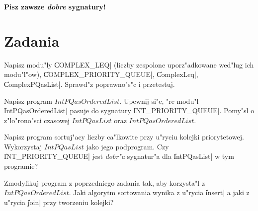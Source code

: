 \bigskip
{\bf Pisz zawsze \emph{dobre} sygnatury!}


\section*{Zadania}
\begin{zadania}         %

\item
Napisz modu"ly \|COMPLEX_LEQ| (liczby zespolone uporz"adkowane wed"lug ich modu"l"ow), 
\|COMPLEX_PRIORITY_QUEUE|, \|ComplexLeq|, \|ComplexPQasList|. Sprawd"z poprawno"s"c i przetestuj.

\item
Napisz program $IntPQasOrderedList$. Upewnij si"e, "re modu"l \|IntPQasOrderedList| pasuje do sygnatury \|INT_PRIORITY_QUEUE|.
Pomy"sl o z"lo"rono"sci czasowej $IntPQasList$ oraz $IntPQasOrderedList$.

\item
Napisz program sortuj"acy liczby ca"lkowite przy u"ryciu kolejki priorytetowej. 
Wykorzystaj $IntPQasList$ jako jego podprogram. 
Czy \|INT_PRIORITY_QUEUE| jest \emph{dobr"a} sygnatur"a 
dla \|IntPQasList| w tym programie?

\item
Zmodyfikuj program z poprzedniego zadania tak,
aby korzysta"l z $IntPQasOrderedList$.
Jaki algorytm sortowania wynika z u"rycia \|insert| 
a jaki z u"rycia \|join| przy tworzeniu kolejki?

\end{zadania}


